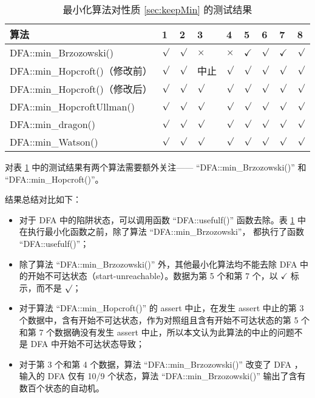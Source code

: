 \begin{table}[!htbp]
    \caption{ 最小化算法对性质 \ref{sec:keepMin} 的测试结果 }
    \label{tab:KeepMinResult}
    \centering
    \small%
    \setlength{\tabcolsep}{4pt}%
    \renewcommand{\arraystretch}{1.2}%
    \begin{tabular}{l|p{2em}<{\centering} p{2em}<{\centering} p{2em}<{\centering} p{2em}<{\centering} p{2em}<{\centering} p{2em}<{\centering} p{2em}<{\centering} p{2em}<{\centering}}  %
        \toprule %
        算法 & 1 & 2 & 3 & 4 &  5 &  6  & 7 & 8  \\
        \midrule
        DFA::min\_Brzozowski()        & $\surd$ & $\surd$ & $\times$  & $\times$  & $\checkmark$ & $\surd$ & $\checkmark$ & $\surd$ \\
        DFA::min\_Hopcroft()（修改前） & $\surd$ & $\surd$ & 中止    & $\surd$     & $\surd$ & $\surd$ & $\surd$ & $\surd$ \\
        DFA::min\_Hopcroft()（修改后） & $\surd$ & $\surd$ & $\surd$ & $\surd$     & $\surd$ & $\surd$ & $\surd$ & $\surd$ \\
        DFA::min\_HopcroftUllman()    & $\surd$ & $\surd$ & $\surd$ & $\surd$     & $\surd$ & $\surd$ & $\surd$ & $\surd$ \\
        DFA::min\_dragon()            & $\surd$ & $\surd$ & $\surd$ & $\surd$     & $\surd$ & $\surd$ & $\surd$ & $\surd$ \\
        DFA::min\_Watson()            & $\surd$ & $\surd$ & $\surd$ & $\surd$     & $\surd$ & $\surd$ & $\surd$ & $\surd$ \\
        \bottomrule%
    \end{tabular}
\end{table}

对表 \ref{tab:KeepMinResult} 中的测试结果有两个算法需要额外关注—— “DFA::min\_Brzozowski()” 和 “DFA::min\_Hopcroft()”。

结果总结对比如下：
\begin{itemize}
    \item 对于 DFA 中的陷阱状态，可以调用函数 “DFA::usefulf()” 函数去除。表 \ref{tab:KeepMinResult} 中在执行最小化函数之前，除了算法 “DFA::min\_Brzozowski”， 都执行了函数 “DFA::usefulf()”；
    \item 除了算法 “DFA::min\_Brzozowski()” 外，其他最小化算法均不能去除 DFA 中的开始不可达状态（start-unreachable）。数据为第 5 个和第 7 个，以 $\checkmark$ 标示，而不是 $\surd$；
    \item 对于算法 “DFA::min\_Hopcroft()” 的 assert 中止，在发生 assert 中止的第 3 个数据中，含有开始不可达状态，作为对照组且含有开始不可达状态的第 5 个和第 7 个数据确没有发生 assert 中止，所以本文认为此算法的中止的问题不是 DFA 中开始不可达状态导致；
    \item 对于第 3 个和第 4 个数据，算法 “DFA::min\_Brzozowski()” 改变了 DFA ，输入的 DFA 仅有 10/9 个状态，算法 “DFA::min\_Brzozowski()” 输出了含有数百个状态的自动机。
\end{itemize}




